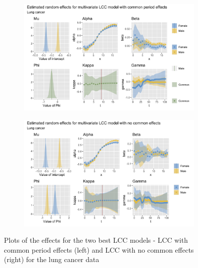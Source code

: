 \begin{figure}[h!]
    \centering
    \begin{subfigure}[b]{.45\linewidth}
        \includegraphics[width=\linewidth]{real-data/real-data-multivariate/Figures/effects-LCC-common-period-lung.png}
    \end{subfigure}
    \begin{subfigure}[b]{.45\linewidth}
        \includegraphics[width=\linewidth]{real-data/real-data-multivariate/Figures/effects-LCC-no-common-lung.png}
    \end{subfigure}
    \caption{Plots of the effects for the two best LCC models - LCC with common period effects (left) and LCC with no common effects (right) for the lung cancer data}
    \label{fig:effects-LCC-lung}
\end{figure}

